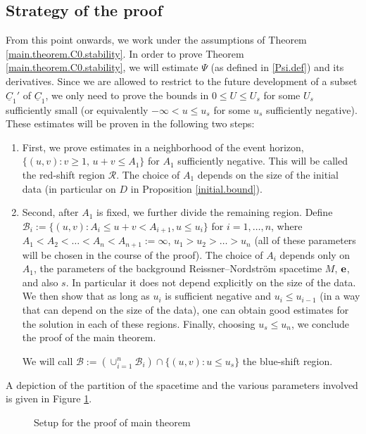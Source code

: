 \documentclass[10pt, reqno]{amsart}
\theoremstyle{definition}
\theoremstyle{remark}
\numberwithin{equation}{section}
\newcommand{\0}{\emptyset}
\begin{document}
\subsection{Strategy of the proof}\label{sec.strategy}

From this point onwards, we work under the assumptions of Theorem \ref{main.theorem.C0.stability}. In order to prove Theorem \ref{main.theorem.C0.stability}, we will estimate $\Psi$ (as defined in \eqref{Psi.def}) and its derivatives. Since we are allowed to restrict to the future development of a subset $\underline{C}_1'$ of $\underline{C}_1$, we only need to prove the bounds in $0\leq U\leq U_s$ for some $U_s$ sufficiently small (or equivalently $-\infty<u\leq u_s$ for some $u_s$ sufficiently negative). These estimates will be proven in the following two steps:
\begin{enumerate}
\item First, we prove estimates in a neighborhood of the event horizon, $\{(u,v):v\geq 1,\, u+v\leq A_1\}$ for $A_1$ sufficiently negative. This will be called the red-shift region $\mathcal R$. The choice of $A_1$ depends on the size of the initial data (in particular on $D$ in Proposition \ref{initial.bound}).
\item Second, after $A_1$ is fixed, we further divide the remaining region. Define $\mathcal B_i:=\{(u,v): A_i\leq u+v< A_{i+1}, u\leq u_i\}$ for $i=1,\ldots, n$, where $A_1<A_2<\dots<A_n<A_{n+1}:=\infty$, $u_1>u_2>\dots >u_n$ (all of these parameters will be chosen in the course of the proof). The choice of $A_i$ depends only on $A_1$, the parameters of the background Reissner--Nordstr\"om spacetime $M$, ${\bf e}$, and also $s$. In particular it does not depend explicitly on the size of the data. We then show that as long as $u_i$ is sufficient negative and $u_i\leq u_{i-1}$ (in a way that can depend on the size of the data), one can obtain good estimates for the solution in each of these regions. Finally, choosing $u_s\leq u_n$, we conclude the proof of the main theorem.

We will call $\mathcal B:=(\cup_{i=1}^n \mathcal B_i)\cap \{(u,v): u\leq u_s\}$ the blue-shift region.  
\end{enumerate}

A depiction of the partition of the spacetime and the various parameters involved is given in Figure \ref{fig:setup}.
\begin{figure}[htbp]
\begin{center}
 
\caption{Setup for the proof of main theorem} \label{fig:setup}
\end{center}
\end{figure}
\end{document}
